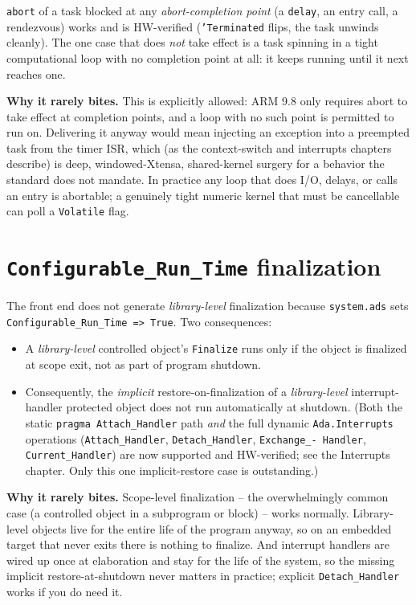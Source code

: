 \texttt{abort} of a task blocked at any \emph{abort-completion point}
(a \texttt{delay}, an entry call, a rendezvous) works and is HW-verified
(\texttt{'Terminated} flips, the task unwinds cleanly). The one case that does
\emph{not} take effect is a task spinning in a tight computational loop with no
completion point at all: it keeps running until it next reaches one.

\textbf{Why it rarely bites.} This is explicitly allowed: ARM 9.8 only
requires abort to take effect at completion points, and a loop with no such point
is permitted to run on. Delivering it anyway would mean injecting an exception
into a preempted task from the timer ISR, which (as the context-switch and
interrupts chapters describe) is deep, windowed-Xtensa, shared-kernel surgery
for a behavior the standard does not mandate. In practice any loop that
does I/O, delays, or calls an entry is abortable; a genuinely tight numeric
kernel that must be cancellable can poll a \texttt{Volatile} flag.

\section{\texttt{Configurable\_Run\_Time} finalization}

The front end does not generate \emph{library-level} finalization because
\texttt{system.ads} sets \texttt{Configurable\_Run\_Time => True}. Two consequences:

\begin{itemize}
  \item A \emph{library-level} controlled object's \texttt{Finalize} runs only if
        the object is finalized at scope exit, not as part of program shutdown.
  \item Consequently, the \emph{implicit} restore-on-finalization of a
        \emph{library-level} interrupt-handler protected object does not run
        automatically at shutdown. (Both the static \texttt{pragma Attach\_Handler}
        path \emph{and} the full dynamic \texttt{Ada.Interrupts} operations
        (\texttt{Attach\_Handler}, \texttt{Detach\_Handler}, \texttt{Exchange\_-
        Handler}, \texttt{Current\_Handler}) are now supported and
        HW-verified; see the Interrupts chapter. Only this one implicit-restore
        case is outstanding.)
\end{itemize}

\textbf{Why it rarely bites.} Scope-level finalization -- the overwhelmingly
common case (a controlled object in a subprogram or block) -- works normally.
Library-level objects live for the entire life of the program anyway, so on an
embedded target that never exits there is nothing to finalize. And interrupt
handlers are wired up once at elaboration and stay for the life of the system, so
the missing implicit restore-at-shutdown never matters in practice; explicit
\texttt{Detach\_Handler} works if you do need it.

